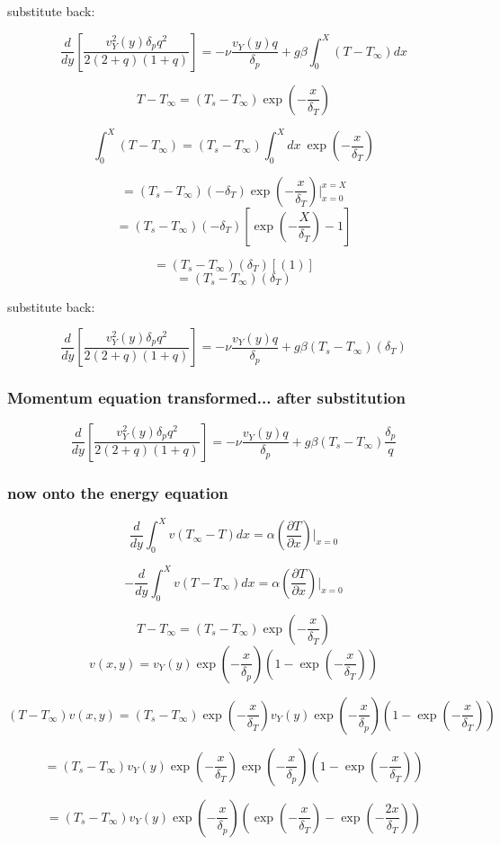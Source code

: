\documentclass[11pt]{article}
\begin{document}
substitute back:

$$\frac{d}{dy} \left[  \frac{v_Y^2 (y) \delta_p q^2  }{2(2+q)(1+ q)} \right] = - \nu  \frac{ v_Y (y) q}{\delta_p} + g\beta \int_0^X (T-T_\infty) dx$$

$$T-T_\infty = (T_s -T_\infty) \exp (-\frac{x}{\delta_T})$$

$$\int_0^X (T-T_\infty) = (T_s -T_\infty) \int_0^X dx \ \exp (-\frac{x}{\delta_T})$$

$$ = (T_s -T_\infty) (-\delta_T) \exp (-\frac{x}{\delta_T})|_{x=0}^{x=X}$$
$$ = (T_s -T_\infty) (-\delta_T) [\exp (-\frac{X}{\delta_T})-1]$$

$$ = (T_s -T_\infty) (\delta_T) [(1)]$$
$$ = (T_s -T_\infty) (\delta_T) $$

substitute back:

$$\frac{d}{dy} \left[  \frac{v_Y^2 (y) \delta_p q^2  }{2(2+q)(1+ q)} \right] = - \nu  \frac{ v_Y (y) q}{\delta_p} + g\beta  (T_s -T_\infty) (\delta_T)$$

\subsubsection{Momentum equation transformed... after substitution}
$$\frac{d}{dy} \left[  \frac{v_Y^2 (y) \delta_p q^2  }{2(2+q)(1+ q)} \right] = - \nu  \frac{ v_Y (y) q}{\delta_p} + g\beta  (T_s -T_\infty) \frac{\delta_p}{q}$$


\subsubsection{now onto the energy equation}

$$\frac{d}{dy} \int_0^X v (T_\infty - T) dx = \alpha (\frac{\partial T}{\partial x})|_{x=0}$$

$$-\frac{d}{dy} \int_0^X v (T- T_\infty ) dx = \alpha (\frac{\partial T}{\partial x})|_{x=0}$$


$$T-T_\infty = (T_s -T_\infty) \exp (-\frac{x}{\delta_T})$$
$$v (x,y) = v_Y (y) \exp (-\frac{x}{\delta_p}) (1- \exp (-\frac{x}{\delta_T}))$$

$$(T-T_\infty )v (x,y) = (T_s -T_\infty) \exp (-\frac{x}{\delta_T})v_Y (y) \exp (-\frac{x}{\delta_p}) (1- \exp (-\frac{x}{\delta_T}))$$

$$ = (T_s -T_\infty)v_Y (y) \exp (-\frac{x}{\delta_T}) \exp (-\frac{x}{\delta_p}) (1- \exp (-\frac{x}{\delta_T}))$$

$$ = (T_s -T_\infty)v_Y (y)  \exp (-\frac{x}{\delta_p}) (\exp (-\frac{x}{\delta_T})- \exp (-\frac{2x}{\delta_T}))$$
\end{document}
